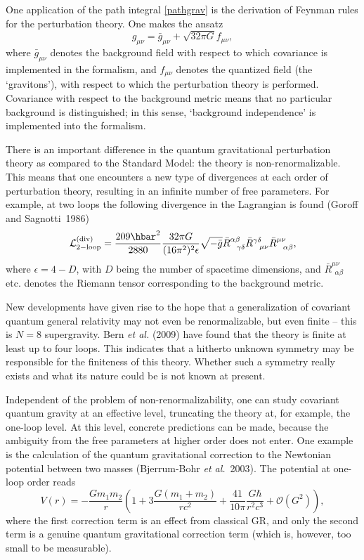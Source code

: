 \documentclass[12pt]{article}
\newcommand{\be}{\begin{equation}}
\newcommand{\ee}{\end{equation}}
\newcommand{\lb}{\label}
\begin{document}
One application of the path integral \eqref{pathgrav} is the
derivation of Feynman rules for the perturbation theory. One makes the ansatz
\be
\lb{2.59}
g_{\mu\nu}=\bar{g}_{\mu\nu}+\sqrt{32\pi G}f_{\mu\nu},
\ee
where $\bar{g}_{\mu\nu}$ denotes the background field with respect to
which covariance is implemented in the
formalism, and $f_{\mu\nu}$ denotes the quantized field (the `gravitons'), with
respect to which the perturbation theory is performed.
Covariance with respect to the background metric means
that no particular background is distinguished; in this sense, `background
independence' is implemented into the formalism.

There is an important difference in the quantum gravitational
perturbation theory as compared to the Standard Model: the theory is
non-re\-norma\-lizable. This means that one encounters a new type of
divergences at each order of perturbation theory, resulting in an
infinite number of free parameters. 
For example, at two loops the following divergence in the Lagrangian
is found (Goroff and Sagnotti~1986) 
\be
\lb{2.79}
{\mathcal L}^{({\rm div})}_{2-{\rm loop}}=
\frac{209\hbar^2}{2880}\frac{32\pi G}{(16\pi^2)^2\epsilon}\sqrt{-\bar{g}}
\bar{R}^{\alpha\beta}_{\ \ \gamma\delta}
\bar{R}^{\gamma\delta}_{\ \ \mu\nu}\bar{R}^{\mu\nu}_{\ \ \alpha\beta} ,
\ee
where $\epsilon=4-D$, with $D$ being the number of spacetime
dimensions, and $\bar{R}^{\mu\nu}_{\ \ \alpha\beta}$ etc. denotes the
Riemann tensor corresponding to the background metric.

New developments have given rise to the hope that a generalization of
covariant quantum general relativity may not even be renormalizable,
but even finite -- this is $N=8$ supergravity. Bern {\em et al.}
(2009) have found that the theory is finite at least up to four
loops. This indicates that a hitherto unknown symmetry may be responsible
for the finiteness of this theory. Whether such a symmetry
really exists and what its nature could be is not known at present.

Independent of the problem of non-renormalizability, one can study
covariant quantum gravity at an effective level, truncating the theory
at, for example, the one-loop level. At this level, concrete
predictions can be made, because the ambiguity from the free
parameters at higher order does not enter. One example is the
calculation of the quantum gravitational correction to the Newtonian
potential between two masses (Bjerrum-Bohr {\em et al.}~2003).
The potential at one-loop order reads
\be
\lb{2.82}
V(r)=-\frac{Gm_1m_2}{r}\left(1+3\frac{G(m_1+m_2)}{rc^2}
+\frac{41}{10\pi}\frac{G\hbar}{r^2c^3}+{\mathcal O}(G^2)\right),
\ee
where the first correction term is an effect from classical GR, and
only the second term is a genuine quantum gravitational correction
term (which is, however, too small to be measurable). 
\end{document}
